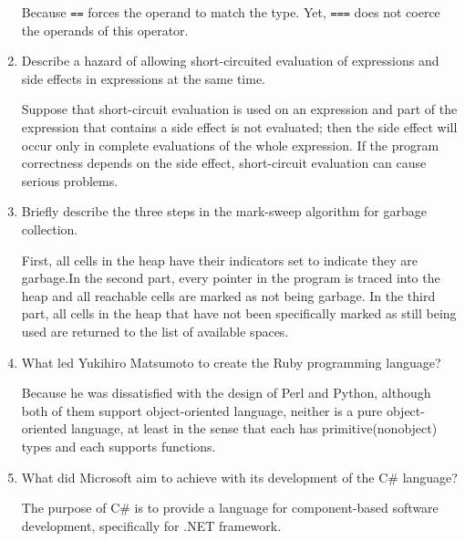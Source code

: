 \begin{enumerate}
  \begin{answer}

    Because \verb+==+ forces the operand to match the type. Yet, \verb+===+ does not coerce the operands of this operator. 

    \end{answer}

  \item Describe a hazard of allowing short-circuited evaluation
    of expressions and side effects in expressions at the same time.

  \begin{answer}

   Suppose that short-circuit evaluation is used on an expression and part of the expression that contains a side effect is not evaluated; then the side effect will occur only in complete evaluations of the whole expression. If the program correctness depends on the side effect, short-circuit evaluation can cause serious problems. 

    \end{answer}

  \item Briefly describe the three steps in the mark-sweep algorithm
    for garbage collection.

  \begin{answer}

    First, all cells in the heap have their indicators set to indicate they are garbage.In the second part, every pointer in the program is traced into the heap and all reachable cells are marked as not being garbage. In the third part, all cells in the heap that have not been specifically marked as still being used are returned to the list of available spaces.  

    \end{answer}

  \item What led Yukihiro Matsumoto to create the Ruby programming language?

  \begin{answer}

    Because he was dissatisfied with the design of Perl and Python, although both of them support object-oriented language, neither is a pure object-oriented language, at least in the sense that each has primitive(nonobject) types and each supports functions. 

    \end{answer}

  \item What did Microsoft aim to achieve with its development of the
    C\# language?

  \begin{answer}

    The purpose of C\# is to provide a language for component-based software development, specifically for .NET framework. 

    \end{answer}

  \end{enumerate}


